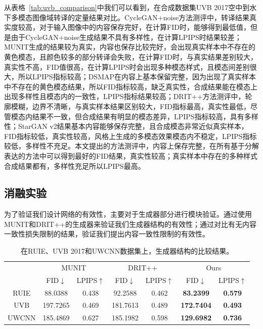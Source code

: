 从表格~\ref{tab:uvb_comparison}中我们可以看到，在合成数据集UVB 2017空中到水下多模态图像域转译的定量结果对比。CycleGAN+noise方法测评中，转译结果真实度较高，对于输入图像中的内容保存完好，在计算FID时，能够得到最低值，但是由于CycleGAN+noise生成结果不具有多样性，在计算LPIPS时结果较差；MUNIT生成的结果较为真实，内容也保存比较完好，会出现真实样本中不存在的黄色模态，且颜色较多的部分转译会失败，在计算FID时，与真实结果差别较大，真实性不高，FID值很高，在计算LPIPS时会出现多种模态样式，且模态间差别很大，所以LPIPS指标较高；DSMAP在内容上基本保留完整，因为出现了真实样本中不存在的黄色模态结果，所以FID指标较高，缺乏真实性，合成结果能在模态上出现多样性且模态内的一致性，LPIPS指标结果较高；DRIT++方法测评中，轮廓模糊，边界不清晰，与真实样本结果区别较大，FID指标最高，真实性最低，尽管模态内结果不一致，但合成结果有明显的模态差异，LPIPS指标较高，具有多样性；StarGAN v2结果基本内容能够保存完整，且合成模态非常近似真实样本，FID指标较低，真实性较高，风格上生成的多模态效果模态内不稳定，LPIPS指标较低，多样性不充足。本文提出的方法测评中，内容上保存完整，在所有基于分解表达的方法中可以得到最好的FID结果，真实性较高；真实样本中存在的多种样式合成结果都有，多样性充足所以LPIPS最高。

\subsection{消融实验}

为了验证我们设计网络的有效性，主要对于生成器部分进行模块验证。通过使用MUNIT和DRIT++的生成器来验证我们生成器结构的有效性；通过对比有无内容一致性损失限制的结果，验证我们提出内容一致性限制的有效性。

\begin{table}[htbp]
  \centering
  \caption{在RUIE、UVB 2017和UWCNN数据集上，生成器结构的比较结果。}
    \begin{tabular}{c|c|c|c|c|c|c}
    \hline
    \multirow{2}[3]{*}{} & \multicolumn{2}{c|}{MUNIT} & \multicolumn{2}{c|}{DRIT++} & \multicolumn{2}{c}{Ours} \\
\cmidrule{2-7}          & \multicolumn{1}{c|}{FID$\downarrow$ } & \multicolumn{1}{c|}{LPIPS$\uparrow$} & \multicolumn{1}{c|}{FID$\downarrow$ } & \multicolumn{1}{c|}{LPIPS$\uparrow$} & \multicolumn{1}{c|}{FID$\downarrow$ } & LPIPS$\uparrow$ \\
    \midrule
    RUIE  & 88.0388 & 0.438 & 92.2588 & 0.462 & \textbf{83.2399} & \textbf{0.579} \\
    UVB  & 197.7265 & 0.469 & 181.7613 & 0.489 & \textbf{172.7404} & \textbf{0.493} \\
    UWCNN & 185.4869 & 0.627 & 185.1982 & 0.598 & \textbf{129.6982} & \textbf{0.736} \\
    \hline
    \end{tabular}%
  \label{tab:comp_G}%
\end{table}%

